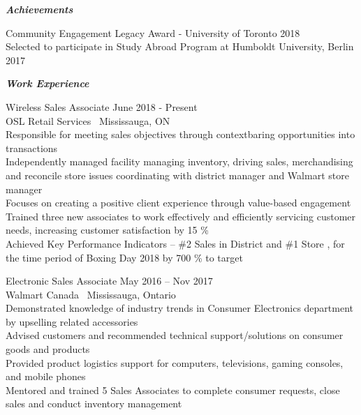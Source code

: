 \documentclass{article}
\begin{document}
\begin{center}
    \large  \textcolor{ablue}{\textit{\textbf{Achievements}}}
   \end{center}
   
\indent Community Engagement Legacy Award - University of Toronto
\hfill 2018
\\\indent Selected to participate in Study Abroad Program at Humboldt University, Berlin                 
\hfill 2017


\newpage

\begin{center}
  \large  \textcolor{ablue}{\textit{\textbf{Work Experience}}}
\end{center}


\noindent Wireless Sales Associate                                                          
\hfill June 2018 - Present 
\\ \noindent OSL Retail Services  \textbar \  Mississauga, ON                  
\\Responsible for meeting sales objectives through contextbaring opportunities into transactions
\\Independently managed facility managing inventory, driving sales, merchandising and reconcile store issues  coordinating with district manager and Walmart store manager 
\\Focuses on creating a positive client experience through value-based engagement
\\Trained three new associates to work effectively and efficiently servicing customer needs, increasing customer satisfaction by 15 \%
\\Achieved Key Performance Indicators – \#2 Sales in District and  \#1 Store , for the time period of Boxing Day 2018 by 700 \% to target

\bigskip


\noindent Electronic Sales Associate                                                                
\hfill May 2016 – Nov 2017 
\\ \noindent Walmart Canada  \textbar \  Mississauga, Ontario                 
\\Demonstrated knowledge of industry trends in Consumer Electronics department by upselling  related accessories
\\Advised customers and recommended technical support/solutions on consumer goods and products
\\Provided product logistics support for computers, televisions, gaming consoles, and mobile phones 
\\Mentored and trained 5 Sales Associates to complete consumer requests, close sales and conduct inventory management 
\end{document}
